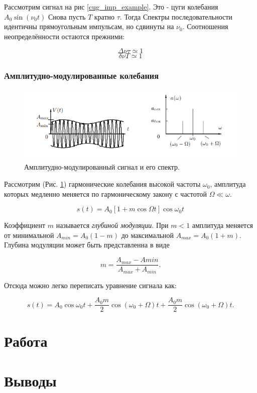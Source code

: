 \documentclass{article}
\begin{document}
Рассмотрим сигнал на рис \ref{cug_imp_example}. Это - цуги колебания \( A_0 \sin \left(\nu_0t\right) \)
Снова пусть $T$ кратно $\tau$. Тогда Спектры последовательности идентичны прямоугольным импульсам, но
сдвинуты на $\nu_0$. Соотношения неопределённости остаются прежними:

\[ \Delta\nu\tau \simeq 1 \]
\[ \delta\nu T \simeq 1 \]

\subsubsection{Амплитудно-модулированные колебания}
\begin{figure}[H]
    \centering
    \includegraphics[width=\textwidth]{AM_signal_example.png}
    \caption{Амплитудно-модулированный сигнал и его спектр.} 
    \label{AM_sig_example}
\end{figure}

Рассмотрим (Рис. \ref{AM_sig_example}) гармонические колебания высокой частоты $\omega_0$, амплитуда которых
медленно меняется по гармоническому закону с частотой $\Omega \ll \omega$.

\[ s(t) = A_0\left[1 + m \cos \Omega t\right] \cos \omega_0 t \]

Коэффициент $m$ называется \emph{глубиной модуляции}. При \( m < 1 \) амплитуда меняется от минимальной 
\( A_{min} = A_0(1 - m) \) до максимальной \( A_{max} = A_0(1 + m) \). Глубина модуляции может быть представленна
в виде

\[ m = \frac{A_{max} - A{min}}{A_{max} + A_{min}}. \]

Отсюда можно легко переписать уравнение сигнала как:

\[ s(t) = A_0 \cos \omega_0t + \frac{A_0m}{2} \cos \left(\omega_0 + \Omega\right)t  + \frac{A_0m}{2} 
\cos \left(\omega_0 + \Omega\right)t.\]




\section{Работа}



\section{Выводы}
\end{document}
